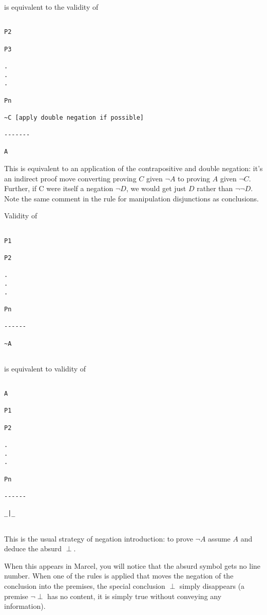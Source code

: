 \documentclass[12pt]{article}
\begin{document}
is equivalent to the validity of
{\small 
\begin{verbatim}

P2

P3

.
.
.

Pn

~C [apply double negation if possible]

-------

A

\end{verbatim}}

This is equivalent to an application of the contrapositive and double negation:  it's an indirect
proof move converting proving $C$ given $\neg A$ to proving $A$ given $\neg C$.  Further, if C were itself
a negation $\neg D$, we would get just $D$ rather than $\neg \neg D$.  Note the same comment in
the rule for manipulation disjunctions as conclusions.

\newpage

Validity of 

\begin{verbatim}

P1

P2

.
.
.

Pn

------

~A


\end{verbatim}

is equivalent to validity of 

\begin{verbatim}

A

P1

P2

.
.
.

Pn

------

_|_


\end{verbatim}

This is the usual strategy of negation introduction:  to prove $\neg A$ assume $A$ and deduce the absurd $\perp$.

When this appears in Marcel, you will notice that the absurd symbol gets no line number.  When one of the rules
is applied that moves the negation of the conclusion into the premises, the special conclusion $\perp$ simply disappears
(a premise $\neg \perp$ has no content, it is simply true without conveying any information).
\end{document}
